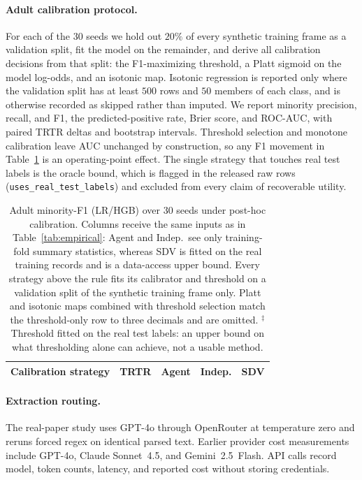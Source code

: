\documentclass[letterpaper]{article} %
\begin{document}
\paragraph{Adult calibration protocol.} For each of the 30 seeds we hold out
$20\%$ of every synthetic training frame as a validation split, fit the model on
the remainder, and derive all calibration decisions from that split: the
F1-maximizing threshold, a Platt sigmoid on the model log-odds, and an isotonic
map. Isotonic regression is reported only where the validation split has at least
$500$ rows and $50$ members of each class, and is otherwise recorded as skipped
rather than imputed. We report minority precision, recall, and F1, the
predicted-positive rate, Brier score, and ROC-AUC, with paired TRTR deltas and
bootstrap intervals. Threshold selection and monotone calibration leave AUC
unchanged by construction, so any F1 movement in Table~\ref{tab:calibration} is
an operating-point effect. The single strategy that touches real test labels is
the oracle bound, which is flagged in the released raw rows
(\texttt{uses\_real\_test\_labels}) and excluded from every claim of recoverable
utility.

\begin{table}[t]
\centering
\scriptsize
\setlength{\tabcolsep}{3pt}
\begin{tabular}{lrrrr}
\toprule
Calibration strategy & TRTR & Agent & Indep. & SDV \\
\midrule
%
\end{tabular}
\caption{Adult minority-F1 (LR/HGB) over 30 seeds under post-hoc calibration.
Columns receive the same inputs as in Table~\ref{tab:empirical}: Agent and
Indep.\ see only training-fold summary statistics, whereas SDV is fitted on the
real training records and is a data-access upper bound. Every strategy above the
rule fits its calibrator and threshold on a validation split of the synthetic
training frame only. Platt and isotonic maps combined with threshold selection
match the threshold-only row to three decimals and are omitted.
$^\ddagger$Threshold fitted on the real test labels: an upper bound on what
thresholding alone can achieve, not a usable method.}
\label{tab:calibration}
\end{table}

\paragraph{Extraction routing.} The real-paper study uses GPT-4o through
OpenRouter at temperature zero and reruns forced regex on identical parsed
text. Earlier provider cost measurements include GPT-4o, Claude Sonnet~4.5, and
Gemini~2.5~Flash. API calls record model, token counts, latency, and reported
cost without storing credentials.
\end{document}

